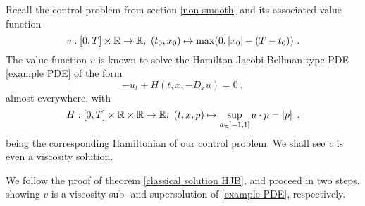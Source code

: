 \begin{example}
	\label{simple viscosity}
	Recall the control problem from section \ref{non-smooth} and its associated value function
	\begin{equation*}
		v : \left[0, T\right] \times \mathbb{R} \to \mathbb{R}, \ (t_0, x_0) \mapsto \max(0, \left\lvert {x_0} \right\rvert - (T - t_0)) \ .
	\end{equation*}
	The value function $ v $ is known to solve the Hamilton-Jacobi-Bellman type PDE \eqref{example PDE} of the form
	\begin{equation*}
		-u_t + H(t, x, -D_x u) = 0 \ ,
	\end{equation*}
	almost everywhere, with
	\begin{equation*}
		H : \left[0, T\right] \times \mathbb{R} \times \mathbb{R} \to \mathbb{R}, \ (t, x, p) \mapsto \sup\limits_{a \in \left[ -1, 1 \right]} a \cdot p = \left\lvert {p} \right\rvert \ ,
	\end{equation*}
	being the corresponding Hamiltonian of our control problem.
	We shall see $ v $ is even a viscosity solution.
	
	We follow the proof of theorem \ref{classical solution HJB}, and proceed in two steps, showing $ v $ is a viscosity sub- and supersolution of \eqref{example PDE}, respectively.
	

\end{example}
